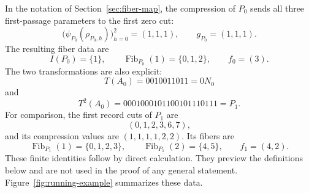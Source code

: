 \documentclass[11pt]{article}
\theoremstyle{definition}
\theoremstyle{remark}
\begin{document}
In the notation of Section~\ref{sec:fiber-map}, the compression of \(P_0\) sends
all three first-passage parameters to the first zero cut:
\[
 \bigl(\psi_{P_0}(\rho_{P_0,h})\bigr)_{h=0}^2=(1,1,1),
 \qquad g_{P_0}=(1,1,1).
\]
The resulting fiber data are
\[
 I(P_0)=\{1\},\qquad
 \operatorname{Fib}_{P_0}(1)=\{0,1,2\},\qquad f_0=(3).
\]
The two transformations are also explicit:
\[
 T(A_0)=0010011011=0N_0
\]
and
\[
 T^2(A_0)=0001000101100101110111=P_1.
\]
For comparison, the first record cuts of \(P_1\) are
\[
 (0,1,2,3,6,7),
\]
and its compression values are \((1,1,1,1,2,2)\).  Its fibers are
\[
 \operatorname{Fib}_{P_1}(1)=\{0,1,2,3\},\qquad
 \operatorname{Fib}_{P_1}(2)=\{4,5\},\qquad f_1=(4,2).
\]
These finite identities follow by direct calculation.  They preview the
definitions below and are not used in the proof of any general statement.
Figure~\ref{fig:running-example} summarizes these data.
\end{document}
